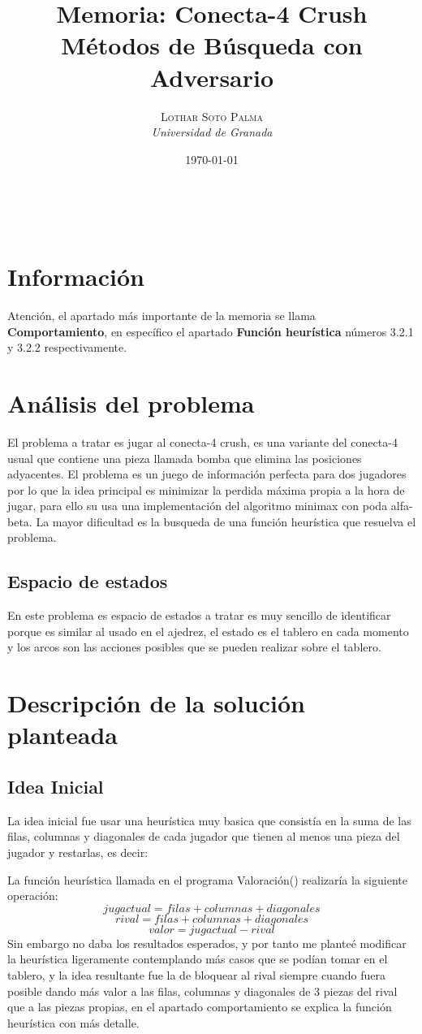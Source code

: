 \documentclass[a4paper, 10pt]{article} %
\title{\textbf{Memoria: Conecta-4 Crush}\\ %
\vspace{20 pt}
Métodos de Búsqueda con Adversario} %
\author{\textsc{Lothar Soto Palma} %
\\{\textit{Universidad de Granada}}} %
\date{\today} %
\makeatletter
\renewcommand{\maketitle}{ %
\begin{center} %
{\Huge\@title} %
\end{center}

\vspace{20pt} %

\begin{flushright} %
{\large\@author} %
\\\@date %

\vspace{40pt} %
\end{flushright}
\renewcommand{\baselinestretch}{0.5}

}
\makeatother
\begin{document}
\maketitle

\section{Información}
Atención, el apartado más importante de la memoria se llama \textbf{Comportamiento}, en específico el apartado \textbf{Función heurística} números 3.2.1 y 3.2.2 respectivamente.

\section{Análisis del problema}
El problema a tratar es jugar al conecta-4 crush, es una variante del conecta-4 usual que contiene una pieza llamada bomba que elimina las posiciones adyacentes. El problema es un juego de información perfecta para dos jugadores por lo que la idea principal es minimizar la perdida máxima propia a la hora de jugar, para ello su usa una implementación del algoritmo minimax con poda alfa-beta. La mayor dificultad es la busqueda de una función heurística que resuelva el problema.
\subsection{Espacio de estados}
En este problema es espacio de estados a tratar es muy sencillo de identificar porque es similar al usado en el ajedrez, el estado es el tablero en cada momento y los arcos son las acciones posibles que se pueden realizar sobre el tablero.
\section{Descripción de la solución planteada}
\subsection{Idea Inicial}
La idea inicial fue usar una heurística muy basica que consistía en la suma de las filas, columnas y diagonales de cada jugador que tienen al menos una pieza del jugador y restarlas, es decir:

La función heurística llamada en el programa Valoración() realizaría la siguiente operación:
$$jugactual=filas+columnas+diagonales$$
$$rival=filas+columnas+diagonales$$
$$valor=jugactual-rival$$
Sin embargo no daba los resultados esperados, y por tanto me planteé modificar la heurística ligeramente contemplando más casos que se podían tomar en el tablero, y la idea resultante fue la de bloquear al rival siempre cuando fuera posible dando más valor a las filas, columnas y diagonales de 3 piezas del rival que a las piezas propias, en el apartado comportamiento se explica la función heurística con más detalle.
\end{document}
